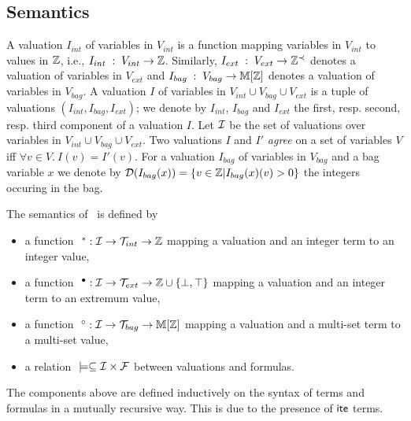 \subsection{Semantics}
\label{ssec:sem}


A valuation $I_{int}$ of variables in $V_{int}$ is a function mapping variables in $V_{int}$ to values in $\mathbb{Z}$, i.e.,
$I_{int} \; : \; V_{int} \rightarrow \mathbb{Z}$.
Similarly, $I_{ext} \; : \; V_{ext} \rightarrow \mathbb{Z}^{\prec}$ denotes a valuation of variables in $V_{ext}$ 
and
$I_{bag} \; : \; V_{bag} \rightarrow \mathbb{M}[\mathbb{Z}]$ denotes a valuation of variables in $V_{bag}$.
A valuation $I$ of variables in $V_{int}\cup V_{bag} \cup V_{ext}$ is a tuple of valuations $(I_{int}, I_{bag}, I_{ext})$;
we denote by $I_{int}$, $I_{bag}$ and $I_{ext}$ the first, resp. second, resp. third component of a valuation $I$.
Let $\mathcal{I}$ be the set of valuations over variables in $V_{int}\cup V_{bag}\cup V_{ext}$.
Two valuations $I$ and $I'$ \emph{agree} on a set of variables $V$ iff $\forall v\in V.\ I(v) = I'(v)$.
For a valuation $I_{bag}$ of variables in $V_{bag}$ and a bag variable $x$ we denote by
$\mathcal{D}(I_{bag}(x)) = \left\{ v \in \mathbb{Z} | I_{bag}(x)(v) > 0 \right\}$ the integers occuring in the bag.

The semantics of \QFBILIA\ is defined by
\begin{itemize}
\item a function $\ ^*: \mathcal{I}\rightarrow \mathcal{T}_{int}\rightarrow \mathbb{Z}$ mapping a valuation and an integer term to an integer value,
\item a function $\ ^{\bullet}: \mathcal{I}\rightarrow \mathcal{T}_{ext}\rightarrow \mathbb{Z}\cup\{\bot,\top\}$ mapping a valuation and an integer term to an extremum value,
\item a function $\ ^\circ: \mathcal{I}\rightarrow \mathcal{T}_{bag}\rightarrow \mathbb{M}[\mathbb{Z}]$ mapping a valuation and a multi-set term to a multi-set value,
\item a relation $\ \models \subseteq \mathcal{I}\times \mathcal{F}$ between valuations and formulas.
\end{itemize}
The components above are defined inductively on the syntax of terms and formulas in a mutually recursive way.
This is due to the presence of $\textsf{ite}$ terms.

